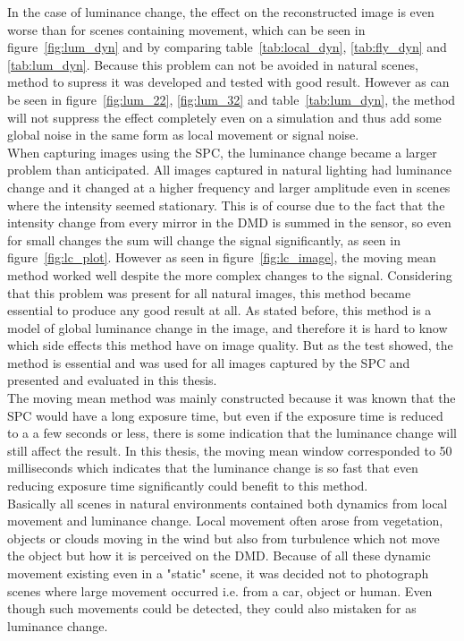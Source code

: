 In the case of luminance change, the effect on the reconstructed image is even worse than for scenes containing movement, which can be seen in figure~\ref{fig:lum_dyn} and by comparing table~\ref{tab:local_dyn}, \ref{tab:fly_dyn} and \ref{tab:lum_dyn}. Because this problem can not be avoided in natural scenes, method to supress it was developed and tested with good result. However as can be seen in figure~\ref{fig:lum_22}, \ref{fig:lum_32} and table~\ref{tab:lum_dyn}, the method will not suppress the effect completely even on a simulation and thus add some global noise in the same form as local movement or signal noise.\\[0.1in]

When capturing images using the SPC, the luminance change became a larger problem than anticipated. All images captured in natural lighting had luminance change and it changed at a higher frequency and larger amplitude even in scenes where the intensity seemed stationary. This is of course due to the fact that the intensity change from every mirror in the DMD is summed in the sensor, so even for small changes the sum will change the signal significantly, as seen in figure~\ref{fig:lc_plot}. However as seen in figure~\ref{fig:lc_image}, the moving mean method worked well despite the more complex changes to the signal. Considering that this problem was present for all natural images, this method became essential to produce any good result at all. As stated before, this method is a model of global luminance change in the image, and therefore it is hard to know which side effects this method have on image quality. But as the test showed, the method is essential and was used for all images captured by the SPC and presented and evaluated in this thesis.\\[0.1in]

The moving mean method was mainly constructed because it was known that the SPC would have a long exposure time, but even if the exposure time is reduced to a a few seconds or less, there is some indication that the luminance change will still affect the result. In this thesis, the moving mean window corresponded to 50 milliseconds which indicates that the luminance change is so fast that even reducing exposure time significantly could benefit to this method.\\[0.1in]


Basically all scenes in natural environments contained both dynamics from local movement and luminance change. Local movement often arose from vegetation, objects or clouds moving in the wind but also from turbulence which not move the object but how it is perceived on the DMD. Because of all these dynamic movement existing even in a "static" scene, it was decided not to photograph scenes where large movement occurred i.e. from a car, object or human. Even though such movements could be detected, they could also mistaken for as luminance change.\\[0.1in]

